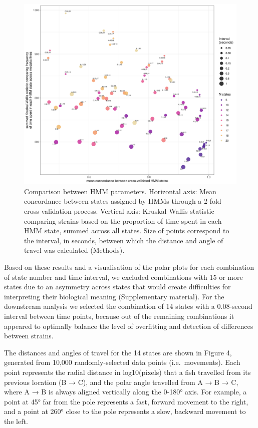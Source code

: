 \documentclass[
]{book}
\begin{document}
\begin{figure}
\includegraphics[width=1\linewidth]{figs/pilot/compare_params} \caption{Comparison between HMM parameters. Horizontal axis: Mean concordance between states assigned by HMMs through a 2-fold cross-validation process. Vertical axis: Kruskal-Wallis statistic comparing strains based on the proportion of time spent in each HMM state, summed across all states. Size of points correspond to the interval, in seconds, between which the distance and angle of travel was calculated (Methods).}\label{fig:compare-params}
\end{figure}

Based on these results and a visualisation of the polar plots for each combination of state number and time interval, we excluded combinations with 15 or more states due to an asymmetry across states that would create difficulties for interpreting their biological meaning (Supplementary material). For the downstream analysis we selected the combination of 14 states with a 0.08-second interval between time points, because out of the remaining combinations it appeared to optimally balance the level of overfitting and detection of differences between strains.

The distances and angles of travel for the 14 states are shown in Figure 4, generated from 10,000 randomly-selected data points (i.e.~movements). Each point represents the radial distance in log10(pixels) that a fish travelled from its previous location (B → C), and the polar angle travelled from A → B → C, where A → B is always aligned vertically along the 0-180° axis. For example, a point at 45° far from the pole represents a fast, forward movement to the right, and a point at 260° close to the pole represents a slow, backward movement to the left.
\end{document}
